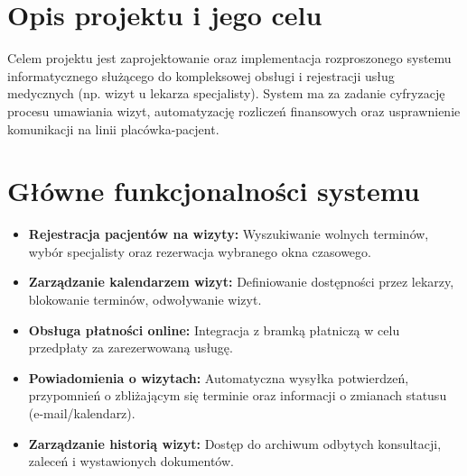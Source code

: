 \documentclass[12pt]{article}
\begin{document}


\section{Opis projektu i jego celu}
Celem projektu jest zaprojektowanie oraz implementacja rozproszonego systemu informatycznego służącego do kompleksowej obsługi i rejestracji usług medycznych (np. wizyt u lekarza specjalisty). System ma za zadanie cyfryzację procesu umawiania wizyt, automatyzację rozliczeń finansowych oraz usprawnienie komunikacji na linii placówka-pacjent.

\section{Główne funkcjonalności systemu}
\begin{itemize}
    \item \textbf{Rejestracja pacjentów na wizyty:} Wyszukiwanie wolnych terminów, wybór specjalisty oraz rezerwacja wybranego okna czasowego.
    \item \textbf{Zarządzanie kalendarzem wizyt:} Definiowanie dostępności przez lekarzy, blokowanie terminów, odwoływanie wizyt.
    \item \textbf{Obsługa płatności online:} Integracja z bramką płatniczą w celu przedpłaty za zarezerwowaną usługę.
    \item \textbf{Powiadomienia o wizytach:} Automatyczna wysyłka potwierdzeń, przypomnień o zbliżającym się terminie oraz informacji o zmianach statusu (e-mail/kalendarz).
    \item \textbf{Zarządzanie historią wizyt:} Dostęp do archiwum odbytych konsultacji, zaleceń i wystawionych dokumentów.
\end{itemize}
\end{document}
